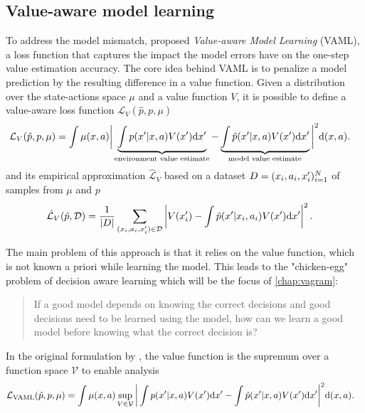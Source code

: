 \subsection{Value-aware model learning}

To address the model mismatch, \textcite{vaml} proposed \emph{Value-aware Model Learning} (VAML), a loss function that captures the impact the model errors have on the one-step value estimation accuracy.
The core idea behind VAML is to penalize a model prediction by the resulting difference in a value function. Given a distribution over the state-actions space $\mu$ and a value function $V$, it is possible to define a value-aware loss function $\mathcal{L}_V(\hat{p}, p, \mu)$
\begin{align}
    &\mathcal{L}_V(\hat{p}, p, \mu) = \int \mu(x,a) \bigg|\underbrace{\int p(x'|x,a)V(x')\mathrm{d}x'}_{\text{environment value estimate}}  - \underbrace{\int \hat{p}(x'|x,a) V(x') \mathrm{d}x'}_{\text{model value estimate}}\bigg|^2 \mathrm{d} (x,a).
\end{align}
and its empirical approximation $\hat{\mathcal{L}}_V$ based on a dataset $D = (x_i,a_i,x'_i)_{i=1}^N$ of samples from $\mu$ and $p$
\begin{align}
    &\hat{\mathcal{L}}_V(\hat{p}, \mathcal{D}) = \frac{1}{|D|}\sum_{(x_i,a_i,x'_i)\in\mathcal{D}} \left|V(x'_i) - \int \hat{p}(x'|x_i,a_i) V(x') \mathrm{d} x'\right|^2\label{eq:background:IterVAMLloss}.
\end{align}

The main problem of this approach is that it relies on the value function, which is not known a priori while learning the model. 
This leads to the "chicken-egg" problem of decision aware learning which will be the focus of \autoref{chap:vagram}:

\begin{quote}
    {If a good model depends on knowing the correct decisions and good decisions need to be learned using the model, how can we learn a good model before knowing what the correct decision is?}
\end{quote}

In the original formulation by \textcite{vaml}, the value function is the supremum over a function space $\mathcal{V}$ to enable analysis
\begin{align}
    &\mathcal{L}_\text{VAML}(\hat{p}, p, \mu) = \int \mu(x,a) \sup_{V\in \mathcal{V}}\bigg|\int p(x'|x,a)V(x')\mathrm{d}x'  - \int \hat{p}(x'|x,a) V(x') \mathrm{d}x'\bigg|^2 \mathrm{d} (x,a).
\end{align}

